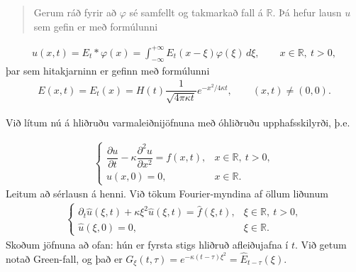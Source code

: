 \documentclass[a4paper,10pt,icelandic]{sphinxmanual}
\begin{document}
\begin{quote}

Gerum ráð fyrir að \(\varphi\) sé samfellt og takmarkað fall á \({{\mathbb R}}\).  Þá hefur  {\hyperref[\detokenize{Kafli04:upphafvarmi}]{}} lausn \(u\) sem gefin er með formúlunni
\end{quote}
\begin{equation*}
\begin{split}u(x,t)=E_t\ast \varphi(x)=\int_{-\infty}^{+\infty}E_t(x-\xi)\varphi(\xi)\,
d\xi, \qquad x\in {{\mathbb  R}}, \ t>0,\end{split}
\end{equation*}
þar sem hitakjarninn er gefinn með formúlunni
\begin{equation*}
\begin{split}E(x,t)=E_t(x)=H(t) \dfrac
1{\sqrt{4{\pi}{\kappa}t}}e^{-x^2/4{\kappa}t},
\qquad (x,t)\neq (0,0).\end{split}
\end{equation*}

Við lítum nú á hliðruðu varmaleiðnijöfnuna með óhliðruðu upphafsskilyrði, þ.e.

\label{\detokenize{Kafli04:upphafvarmi2}}\begin{equation*}
\begin{split}\begin{cases}
\dfrac{{\partial}u}{\partial t}
-{\kappa}\dfrac{\partial^2u}{\partial x^2}=f(x,t), &x\in {{\mathbb  R}}, \ t>0,\\
u(x,0)=0, &x\in {{\mathbb  R}}.
\end{cases}\end{split}
\end{equation*}
Leitum að sérlausn á henni. Við tökum Fourier-myndina af öllum liðunum
\begin{equation*}
\begin{split}\begin{cases}
\partial_t\widehat u({\xi},t)
+{\kappa}{\xi}^2\widehat u({\xi},t)=\widehat f({\xi},t), &{\xi}\in {{\mathbb  R}}, \ t>0,\\
\widehat u({\xi},0)=0, &{\xi}\in {{\mathbb  R}}.
\end{cases}\end{split}
\end{equation*}
Skoðum jöfnuna að ofan: hún er fyrsta stigs hliðruð afleiðujafna í \(t\). Við getum notað Green-fall, og það er \(G_\xi(t,\tau)=e^{-\kappa(t-\tau)\xi^2}=\widehat E_{t-\tau}(\xi)\).
\end{document}
